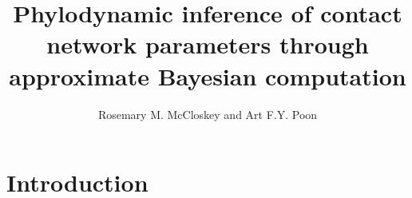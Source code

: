 \documentclass[12pt]{article}
\title{Phylodynamic inference of contact network parameters through approximate
Bayesian computation}
\author{Rosemary M. McCloskey and Art F.Y. Poon}
\begin{document}
\maketitle

\section{Introduction}


\end{document}
